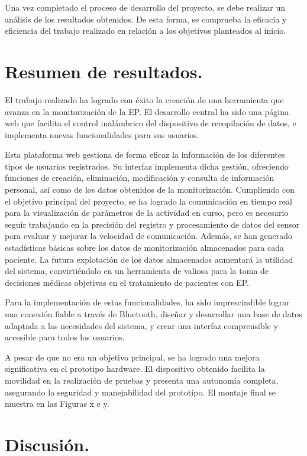 
Una vez completado el proceso de desarrollo del proyecto, se debe realizar un análisis de los resultados obtenidos. De esta forma, se comprueba la eficacia y eficiencia del trabajo realizado en relación a los objetivos planteados al inicio.

\section{Resumen de resultados.}

El trabajo realizado ha logrado con éxito la creación de una herramienta que avanza en la monitorización de la EP. El desarrollo central ha sido una página web que facilita el control inalámbrico del dispositivo de recopilación de datos, e implementa nuevas funcionalidades para sus usuarios.

Esta plataforma web gestiona de forma eficaz la información de los diferentes tipos de usuarios registrados. Su interfaz implementa dicha gestión, ofreciendo funciones de creación, eliminación, modificación y consulta de información personal, así como de los datos obtenidos de la monitorización. Cumpliendo con el objetivo principal del proyecto, se ha logrado la comunicación en tiempo real para la visualización de parámetros de la actividad en curso, pero es necesario seguir trabajando en la precisión del registro y procesamiento de datos del sensor para evaluar y mejorar la velocidad de comunicación. Además, se han generado estadísticas básicas sobre los datos de monitorización almacenados para cada paciente. La futura explotación de los datos almacenados aumentará la utilidad del sistema, convirtiéndolo en un herramienta de valiosa para la toma de decisiones médicas objetivas en el tratamiento de pacientes con EP.

Para la implementación de estas funcionalidades, ha sido imprescindible lograr una conexión fiable a través de Bluetooth, diseñar y desarrollar una base de datos adaptada a las necesidades del sistema, y crear una interfaz comprensible y accesible para todos los usuarios.

A pesar de que no era un objetivo principal, se ha logrado una mejora significativa en el prototipo hardware. El dispositivo obtenido facilita la movilidad en la realización de pruebas y presenta una autonomía completa, asegurando la seguridad y manejabilidad del prototipo. El montaje final se muestra en las Figuras x e y.

\section{Discusión.}

